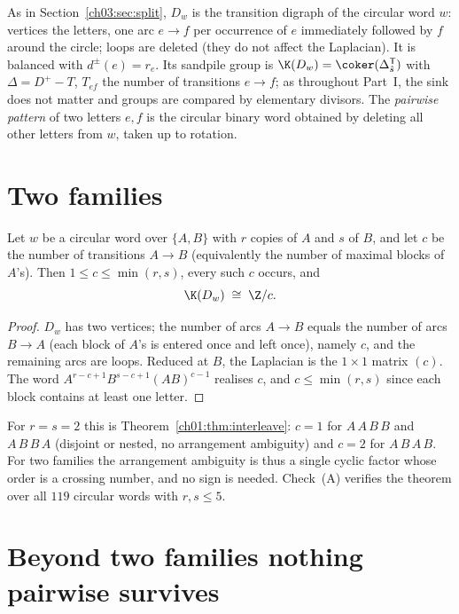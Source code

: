 As in Section~\ref{ch03:sec:split}, $D_w$ is the transition digraph of the circular word $w$: vertices the letters, one arc
$e\to f$ per occurrence of $e$ immediately followed by $f$ around the circle; loops are
deleted (they do not affect the Laplacian). It is balanced with $d^{\pm}(e)=r_e$. Its
sandpile group is $\K(D_w)=\coker(\Delta_{\hat s}^{\mathsf T})$ with $\Delta=D^{+}-T$,
$T_{ef}$ the number of transitions $e\to f$; as throughout Part~I, the sink does not
matter and groups are compared by elementary divisors. The
\emph{pairwise pattern} of two letters $e,f$ is the circular binary word obtained by
deleting all other letters from $w$, taken up to rotation.

\section{Two families}\label{ch04:sec:two}

\begin{theorem}\label{ch04:thm:two}
Let $w$ be a circular word over $\{A,B\}$ with $r$ copies of $A$ and $s$ of $B$, and let
$c$ be the number of transitions $A\to B$ (equivalently the number of maximal blocks of
$A$'s). Then $1\le c\le\min(r,s)$, every such $c$ occurs, and
\[
\K(D_w)\;\cong\;\Z/c .
\]
\end{theorem}

\begin{proof}
$D_w$ has two vertices; the number of arcs $A\to B$ equals the number of arcs $B\to A$
(each block of $A$'s is entered once and left once), namely $c$, and the remaining arcs
are loops. Reduced at $B$, the Laplacian is the $1\times1$ matrix $(c)$. The word
$A^{r-c+1}B^{s-c+1}(AB)^{c-1}$ realises $c$, and $c\le\min(r,s)$ since each block
contains at least one letter.
\end{proof}

For $r=s=2$ this is Theorem~\ref{ch01:thm:interleave}: $c=1$ for
$A\,A\,B\,B$ and $A\,B\,B\,A$ (disjoint or nested, no arrangement ambiguity) and $c=2$
for $A\,B\,A\,B$. For two families the arrangement ambiguity is thus a single cyclic
factor whose order is a crossing number, and no sign is needed. Check~(A) verifies the
theorem over all $119$ circular words with $r,s\le5$.

\section{Beyond two families nothing pairwise survives}\label{ch04:sec:neg}

